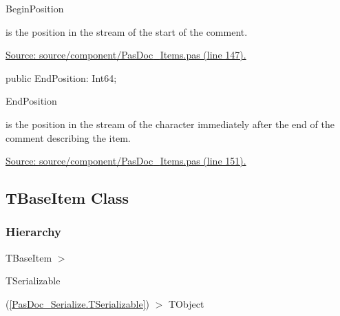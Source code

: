 \documentclass{report}
\newif\ifpdf
\begin{document}
\begin{list}{}
\par \begin{ttfamily}BeginPosition\end{ttfamily} is the position in the stream of the start of the comment.\par
\href{https://github.com/pasdoc/pasdoc/blob/master/source/component/PasDoc_Items.pas#L147}{Source: source/component/PasDoc{\_}Items.pas (line 147).}\label{PasDoc_Items.TRawDescriptionInfo-EndPosition}
\item[\textbf{EndPosition}\hfill]
\ifpdf
\begin{flushleft}
\fi
\begin{ttfamily}
public EndPosition: Int64;\end{ttfamily}

\ifpdf
\end{flushleft}
\fi


\par \begin{ttfamily}EndPosition\end{ttfamily} is the position in the stream of the character immediately after the end of the comment describing the item.\par
\href{https://github.com/pasdoc/pasdoc/blob/master/source/component/PasDoc_Items.pas#L151}{Source: source/component/PasDoc{\_}Items.pas (line 151).}\end{list}
\ifpdf
\subsection*{\large{\textbf{TBaseItem Class}}\normalsize\hspace{1ex}\hrulefill}
\else
\subsection*{TBaseItem Class}
\fi
\label{PasDoc_Items.TBaseItem}
\subsubsection*{\large{\textbf{Hierarchy}}\normalsize\hspace{1ex}\hfill}
TBaseItem {$>$} \begin{ttfamily}TSerializable\end{ttfamily}(\ref{PasDoc_Serialize.TSerializable}) {$>$} 
TObject
\end{document}

